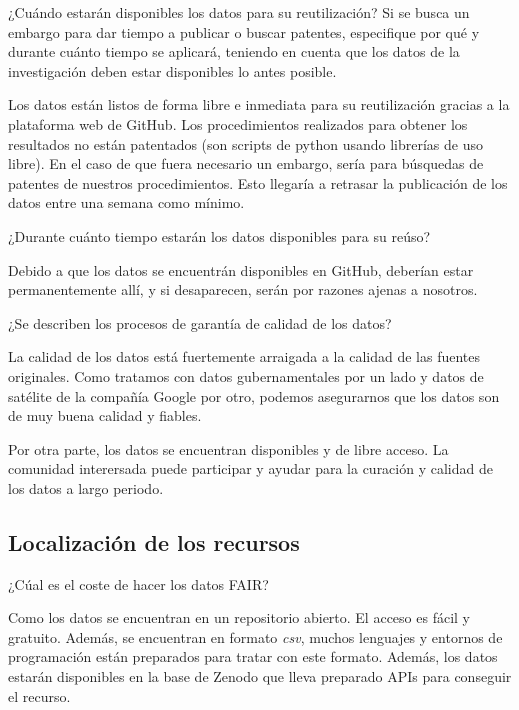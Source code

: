 \documentclass[12pt, spanish]{article}
\begin{document}
\begin{shaded}
¿Cuándo estarán disponibles los datos para su reutilización? Si se busca un embargo para dar tiempo a publicar o buscar patentes, especifique por qué y durante cuánto tiempo se aplicará, teniendo en cuenta que los datos de la investigación deben estar disponibles lo antes posible.
\end{shaded}
Los datos están listos de forma libre e inmediata para su reutilización gracias a la plataforma web de GitHub. Los procedimientos realizados para obtener los resultados no están patentados (son scripts de python usando librerías de uso libre). En el caso de que fuera necesario un embargo, sería para búsquedas de patentes de nuestros procedimientos. Esto llegaría a retrasar la publicación de los datos entre una semana como mínimo.
\\
\begin{shaded}
¿Durante cuánto tiempo estarán los datos disponibles para su reúso?
\end{shaded}
Debido a que los datos se encuentrán disponibles en GitHub, deberían estar permanentemente allí, y si desaparecen, serán por razones ajenas a nosotros.

\begin{shaded}
¿Se describen los procesos de garantía de calidad de los datos?
\end{shaded}
La calidad de los datos está fuertemente arraigada a la calidad de las fuentes originales. Como tratamos con datos gubernamentales por un lado y datos de satélite de la compañía Google por otro, podemos asegurarnos que los datos son de muy buena calidad y fiables.

Por otra parte, los datos se encuentran disponibles y de libre acceso. La comunidad interersada puede participar y ayudar para la curación y calidad de los datos a largo periodo.



\subsection{Localización de los recursos}

\begin{shaded}
¿Cúal es el coste de hacer los datos FAIR?
\end{shaded}
Como los datos se encuentran en un repositorio abierto. El acceso es fácil y gratuito. Además, se encuentran en formato \textit{csv}, muchos lenguajes y entornos de programación están preparados para tratar con este formato. Además, los datos estarán disponibles en la base de Zenodo que lleva preparado APIs para conseguir el recurso.
\end{document}
